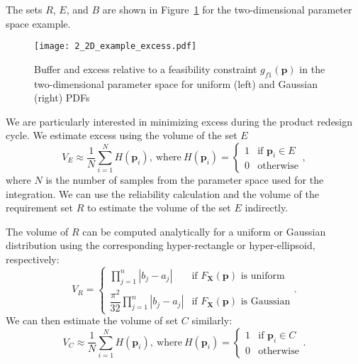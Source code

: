 The sets $R$, $E$, and $B$ are shown in Figure~\ref{fig:2Dexampleexcess} for the two-dimensional parameter space example.
%
\begin{figure}[h]
	\centering
	\texttt{[image: 2\_2D\_example\_excess.pdf]}
	\caption{{\color{red} Buffer and excess relative to a feasibility constraint $g_{f1}(\mathbf{p})$ in the two-dimensional parameter space for uniform (left) and Gaussian (right) \acp{PDF}}}
	\label{fig:2Dexampleexcess}
\end{figure}

We are particularly interested in minimizing excess during the product redesign cycle. We estimate excess using the volume of the set $E$ 
%
\begin{equation} \label{eq:excessmontecarlo}
	V_E \approx \dfrac{1}{N} {\sum\limits_{i=1}^{N} H\left(\mathbf{p}_i\right)}, ~\mathrm{where}~ H\left(\mathbf{p}_i\right)={\begin{cases}1&{\text{if }}\mathbf{p}_i\in E\\0&{\text{otherwise}}\end{cases}},
\end{equation}
%
where $N$ is the number of samples from the parameter space used for the integration. We can use the reliability calculation and the volume of the requirement set $R$ to estimate the volume of the set $E$ indirectly. 

The volume of $R$ can be computed analytically for a uniform or Gaussian distribution using the corresponding hyper-rectangle or hyper-ellipsoid, respectively:
%
\begin{equation} \label{eq:Rmontecarlo}
	V_R = {\begin{cases} \prod\limits_{j=1}^{n} \left|b_j - a_j\right| &{\text{if }}F_\mathbf{X}(\mathbf{p})\text{ is uniform}\\\dfrac{\pi^2}{32}\prod\limits_{j=1}^{n} \left|b_j - a_j\right| &{\text{if }}F_\mathbf{X}(\mathbf{p})\text{ is Gaussian}\end{cases}}.
\end{equation}
%
We can then estimate the volume of set $C$ similarly:
%
\begin{equation} \label{eq:Cmontecarlo}
	V_C \approx \dfrac{1}{N} {\sum\limits_{i=1}^{N} H\left(\mathbf{p}_i\right)}, ~\mathrm{where}~ H\left(\mathbf{p}_i\right)={\begin{cases}1&{\text{if }}\mathbf{p}_i\in C\\0&{\text{otherwise}}\end{cases}}.
\end{equation}

